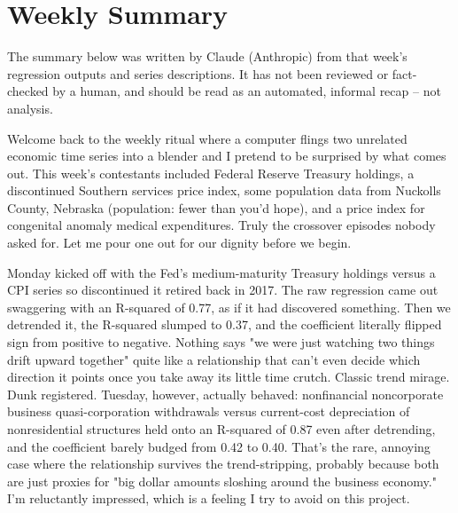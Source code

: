 \section{Weekly Summary}

\begin{tcolorbox}[colback=yellow!10,colframe=black!50,title=AI-Generated Content]
\noindent The summary below was written by Claude (Anthropic) from that week's regression outputs and series descriptions. It has not been reviewed or fact-checked by a human, and should be read as an automated, informal recap -- not analysis.
\end{tcolorbox}

Welcome back to the weekly ritual where a computer flings two unrelated economic time series into a blender and I pretend to be surprised by what comes out. This week's contestants included Federal Reserve Treasury holdings, a discontinued Southern services price index, some population data from Nuckolls County, Nebraska (population: fewer than you'd hope), and a price index for congenital anomaly medical expenditures. Truly the crossover episodes nobody asked for. Let me pour one out for our dignity before we begin.

Monday kicked off with the Fed's medium-maturity Treasury holdings versus a CPI series so discontinued it retired back in 2017. The raw regression came out swaggering with an R-squared of 0.77, as if it had discovered something. Then we detrended it, the R-squared slumped to 0.37, and the coefficient literally flipped sign from positive to negative. Nothing says "we were just watching two things drift upward together" quite like a relationship that can't even decide which direction it points once you take away its little time crutch. Classic trend mirage. Dunk registered. Tuesday, however, actually behaved: nonfinancial noncorporate business quasi-corporation withdrawals versus current-cost depreciation of nonresidential structures held onto an R-squared of 0.87 even after detrending, and the coefficient barely budged from 0.42 to 0.40. That's the rare, annoying case where the relationship survives the trend-stripping, probably because both are just proxies for "big dollar amounts sloshing around the business economy." I'm reluctantly impressed, which is a feeling I try to avoid on this project.

